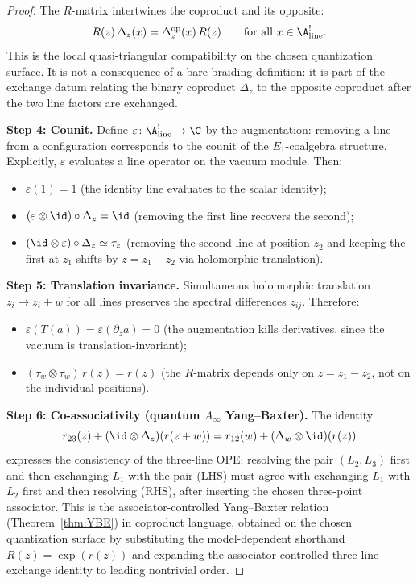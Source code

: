 \begin{proof}
The $R$-matrix intertwines the coproduct and its opposite:
\[
R(z)\,\Delta_z(x) = \Delta_z^{\mathrm{op}}(x)\, R(z) \qquad \text{for all } x \in \A^!_{\mathrm{line}}.
\]
This is the local quasi-triangular compatibility on the chosen
quantization surface. It is not a consequence of a bare braiding
definition: it is part of the exchange datum relating the binary
coproduct \(\Delta_z\) to the opposite coproduct after the two line
factors are exchanged.

\medskip
\noindent\textbf{Step 4: Counit.}
Define $\varepsilon \colon \A^!_{\mathrm{line}} \to \C$ by the augmentation: removing a line from a configuration corresponds to the counit of the $E_1$-coalgebra structure. Explicitly, $\varepsilon$ evaluates a line operator on the vacuum module. Then:
\begin{itemize}
\item $\varepsilon(1) = 1$ (the identity line evaluates to the scalar identity);
\item $(\varepsilon \otimes \id) \circ \Delta_z = \id$ (removing the first line recovers the second);
\item $(\id \otimes \varepsilon) \circ \Delta_z \simeq \tau_z$ (removing the second line at position $z_2$ and keeping the first at $z_1$ shifts by $z = z_1 - z_2$ via holomorphic translation).
\end{itemize}

\medskip
\noindent\textbf{Step 5: Translation invariance.}
Simultaneous holomorphic translation $z_i \mapsto z_i + w$ for all lines preserves the spectral differences $z_{ij}$. Therefore:
\begin{itemize}
\item $\varepsilon(T(a)) = \varepsilon(\partial_z a) = 0$ (the augmentation kills derivatives, since the vacuum is translation-invariant);
\item $(\tau_w \otimes \tau_w)\, r(z) = r(z)$ (the $R$-matrix depends only on $z = z_1 - z_2$, not on the individual positions).
\end{itemize}

\medskip
\noindent\textbf{Step 6: Co-associativity (quantum $A_\infty$ Yang--Baxter).}
The identity
\[
r_{23}(z) + (\id \otimes \Delta_z)(r(z+w)) = r_{12}(w) + (\Delta_w \otimes \id)(r(z))
\]
expresses the consistency of the three-line OPE: resolving the pair
$(L_2,L_3)$ first and then exchanging $L_1$ with the pair (LHS) must
agree with exchanging $L_1$ with $L_2$ first and then resolving (RHS),
after inserting the chosen three-point associator. This is the
associator-controlled Yang--Baxter relation (Theorem~\ref{thm:YBE}) in
coproduct language, obtained on the chosen quantization surface by
substituting the model-dependent shorthand \(R(z)=\exp(r(z))\) and
expanding the associator-controlled three-line exchange identity to
leading nontrivial order.


\end{proof}
